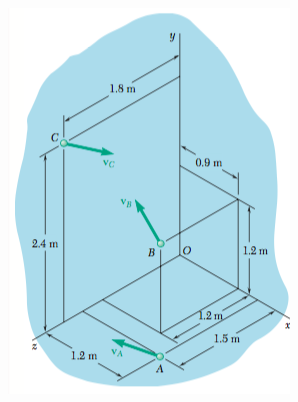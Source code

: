 \begin{enumerate}
	\begin{marginfigure}
		\includegraphics[width=\textwidth]{./images/particulas.png}
	\end{marginfigure}
\end{enumerate}



